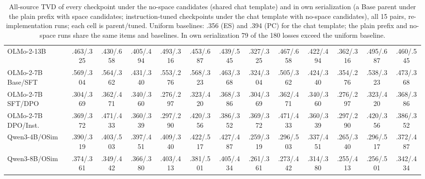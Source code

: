 \begin{table}[t]
\begin{tabular}{@{}lccc@{\hspace{8pt}}ccc@{\hspace{8pt}}ccc@{\hspace{8pt}}ccc@{}}
OLMo-2-13B & .463/.325 & .430/.658 & .405/.494 & .493/.316 & .453/.687 & .439/.545 & .327/.325 & .467/.658 & .422/.494 & .362/.316 & .495/.687 & .460/.545 \\
OLMo-2-7B Base/SFT & .569/.304 & .564/.362 & .431/.340 & .553/.276 & .568/.323 & .463/.368 & .324/.304 & .505/.362 & .424/.340 & .354/.276 & .538/.323 & .473/.368 \\
OLMo-2-7B SFT/DPO & .304/.369 & .362/.471 & .340/.360 & .276/.297 & .323/.420 & .368/.386 & .304/.369 & .362/.471 & .340/.360 & .276/.297 & .323/.420 & .368/.386 \\
OLMo-2-7B DPO/Inst. & .369/.372 & .471/.433 & .360/.339 & .297/.290 & .420/.356 & .386/.352 & .369/.372 & .471/.433 & .360/.339 & .297/.290 & .420/.356 & .386/.352 \\
Qwen3-4B/OSim & .390/.319 & .403/.503 & .397/.451 & .409/.340 & .422/.517 & .427/.487 & .259/.319 & .296/.503 & .337/.451 & .265/.340 & .296/.517 & .372/.487 \\
Qwen3-8B/OSim & .374/.361 & .349/.442 & .366/.380 & .403/.413 & .381/.501 & .405/.434 & .261/.361 & .273/.442 & .314/.380 & .255/.413 & .256/.501 & .342/.434 \\
\bottomrule
\end{tabular}
\caption{All-source TVD of every checkpoint under the no-space candidates (shared chat template) and in own serialization (a Base parent under the plain prefix with space candidates; instruction-tuned checkpoints under the chat template with no-space candidates), all 15 pairs, re-implementation runs; each cell is parent/tuned. Uniform baselines: .356 (ES) and .394 (PC) for the chat template; the plain prefix and no-space runs share the same items and baselines. In own serialization 79 of the 180 losses exceed the uniform baseline.}
\label{tab:own-absolute}
\end{table}
